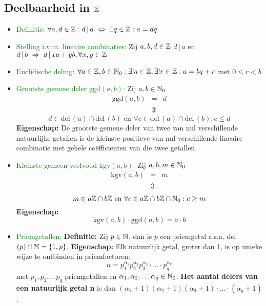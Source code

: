 \subsection{Deelbaarheid in $\mathbb{Z}$} \label{deelbaarheid}
\hypertarget{deelbaarheid}{}
\begin{itemize}%
\item \textcolor{green}{Definitie:}
$\forall a, d \in \Z: d\,|\,a\ \Leftrightarrow\ \exists q\in \Z: a=dq$
\item \textcolor{green}{Stelling i.v.m. lineaire combinaties:}\newline
Zij $a,b,d \in \mathbb{Z}$\newline
$d\,|\,a$ en $d\,|\,b \ \Rightarrow\ d\,|\,xa+yb, \forall x, y \in \mathbb{Z}$
\item \textcolor{green}{Euclidische deling:}\newline
$\forall a \in \mathbb{Z}, b \in \mathbb{N}_0: \exists ! q\in \mathbb{Z}, \exists ! r \in \mathbb{Z}: a=bq+r$ met $0\leq r< b$
\item \textcolor{green}{Grootste gemene deler ggd$(a, b)$:}\newline
Zij $a, b \in \mathbb{N}_0$
\begin{eqnarray*}
\mbox{ggd}(a, b) & = & d\\
  & \Updownarrow & 
\end{eqnarray*}
\[ d \in \mbox{del}\,(a) \cap \mbox{del}\,(b) \mbox{ en } \forall c \in \mbox{del}\,(a) \cap \mbox{del} \,(b) : c \leq d \]\newline
{\bf Eigenschap:} De grootste gemene deler van twee van nul verschillende natuurlijke getallen is de kleinste positieve van nul verschillende lineaire combinatie met gehele co\"effici\"enten van die twee getallen.\vskip 0.5cm
\item \textcolor{green}{Kleinste gemeen veelvoud kgv$(a, b)$:}\newline
Zij $a, b, m \in \mathbb{N}_0$
\begin{eqnarray*}
\mbox{kgv}(a, b) & = & m\\
  & \Updownarrow & 
\end{eqnarray*}
\[ m \in a\mathbb{Z} \cap b\mathbb{Z} \mbox{ en } \forall c \in a\mathbb{Z} \cap b\mathbb{Z} \cap \mathbb{N}_0: c \geq m \]\newline
{\bf Eigenschap: } \[\mbox{kgv}(a, b)\cdot\mbox{ggd}(a, b)=a\cdot b\]
\item \textcolor{green}{Priemgetallen:}\newline
{\bf Definitie: }Zij $p \in \mathbb{N}$, dan is $p$ een priemgetal a.s.a. del$(p) \cap \mathbb{N}=\{1, p\}$.\newline
{\bf Eigenschap: } Elk natuurlijk getal, groter dan 1, is op unieke wijze te ontbinden in priemfactoren: \[n=p_1^{\alpha_1}p_2^{\alpha_2}p_3^{\alpha_3}\cdot\ldots\cdot p_q^{\alpha_q}\]
met $p_1, p_2, \ldots p_q$ priemgetallen en $\alpha_1, \alpha_2,\ldots\alpha_q \in \mathbb{N}_0$.\newline
{\bf Het aantal delers van een natuurlijk getal n} is dan $(\alpha_1+1)(\alpha_2+1)(\alpha_3+1)\cdot\ldots\cdot(\alpha_q+1)$.
\end{itemize}%

